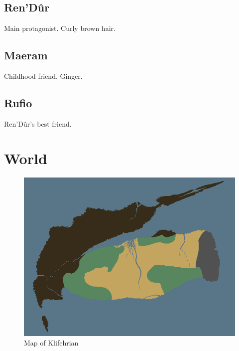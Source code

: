 \documentclass[a4paper,12pt]{book}
\begin{document}
\section{Ren'D\^{u}r}
Main protagonist. Curly brown hair.
\section{Maeram}
Childhood friend. Ginger.
\section{Rufio}
Ren'D\^{u}r's best friend.
\chapter{World}
\begin{figure}[h]
	\centering
		\includegraphics[scale=2]{worldmap.png}
	\caption{Map of Klifehrian}
	\label{fig:worldmap}
\end{figure}
\end{document}
